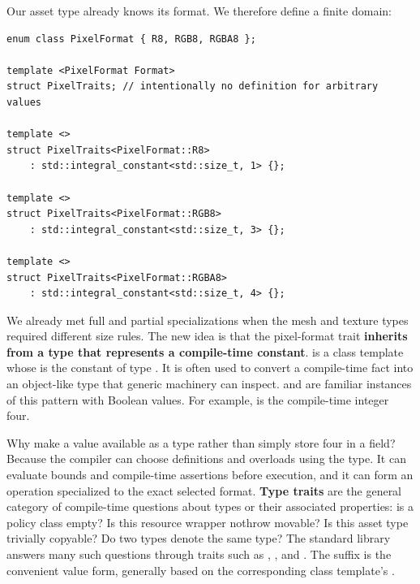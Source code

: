 Our asset type already knows its format. We therefore define a finite domain:

\begin{verbatim}
enum class PixelFormat { R8, RGB8, RGBA8 };

template <PixelFormat Format>
struct PixelTraits; // intentionally no definition for arbitrary values

template <>
struct PixelTraits<PixelFormat::R8>
    : std::integral_constant<std::size_t, 1> {};

template <>
struct PixelTraits<PixelFormat::RGB8>
    : std::integral_constant<std::size_t, 3> {};

template <>
struct PixelTraits<PixelFormat::RGBA8>
    : std::integral_constant<std::size_t, 4> {};
\end{verbatim}

We already met full and partial specializations when the mesh and texture types required different size rules. The new idea is that the pixel-format trait \textbf{inherits from a type that represents a compile-time constant}.  is a class template whose  is the constant  of type . It is often used to convert a compile-time fact into an object-like type that generic machinery can inspect.  and  are familiar instances of this pattern with Boolean values. For example,  is the compile-time integer four.

Why make a value available as a type rather than simply store four in a field? Because the compiler can choose definitions and overloads using the type. It can evaluate bounds and compile-time assertions before execution, and it can form an operation specialized to the exact selected format. \textbf{Type traits} are the general category of compile-time questions about types or their associated properties: is a policy class empty? Is this resource wrapper nothrow movable? Is this asset type trivially copyable? Do two types denote the same type? The standard library answers many such questions through traits such as , , and . The suffix  is the convenient value form, generally based on the corresponding class template's .

